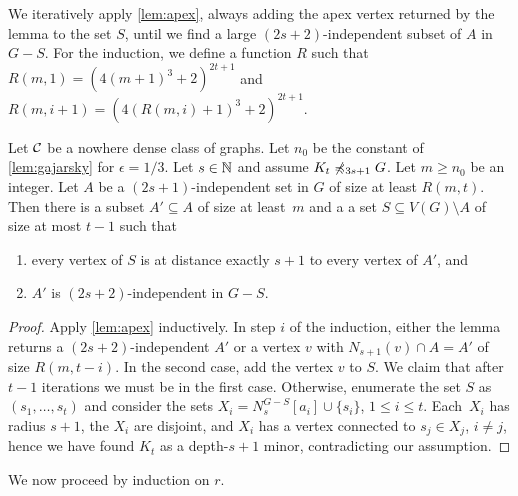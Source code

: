 We iteratively apply \cref{lem:apex}, always adding the apex vertex 
returned by the lemma to the set $S$, until we find a large 
$(2s+2)$-independent subset of $A$ in $G-S$. For the induction, we
define a function $R$ such that $R(m,1)=(4(m+1)^3+2)^{2t+1}$
and $R(m, i+1)=(4(R(m,i)+1)^3+2)^{2t+1}$.

\begin{lemma}\label{lem:iterate-apex}
Let $\mathcal{C}$ be a nowhere dense class of graphs. 
Let $n_0$ be the constant of \cref{lem:gajarsky} for $\epsilon=1/3$. 
Let $s\in \mathbb{N}$ and assume $K_t\not\preccurlyeq_{3s+1} G$. 
Let $m\geq n_0$ be an integer. 
Let $A$ be a $(2s+1)$-independent set in $G$ of size at least $R(m,t)$. 
Then there is a subset $A'\subseteq A$ of size at least~$m$ and a 
a set $S\subseteq V(G)\setminus A$ of size at most $t-1$ such that
\begin{enumerate}
\item every vertex of $S$ is at distance exactly $s+1$ to 
every vertex of $A'$, and
\item $A'$ is $(2s+2)$-independent in $G-S$. 
\end{enumerate} 
\end{lemma}
\begin{proof}
Apply \cref{lem:apex} inductively. In step $i$ of the induction,
either the lemma returns a $(2s+2)$-independent $A'$ or a vertex $v$
with $N_{s+1}(v)\cap A=A'$ of size $R(m,t-i)$. In the second
case, add the vertex $v$ to $S$. We claim that after $t-1$
iterations we must be in the first case. Otherwise, enumerate the set $S$ 
as $(s_1,\ldots, s_t)$ and consider the sets
$X_i=N_s^{G-S}[a_i]\cup \{s_i\}$, $1\leq i\leq t$. Each~$X_i$ has radius
$s+1$, the $X_i$ are disjoint, and $X_i$ has a vertex connected to $s_j\in X_j$, $i\neq j$, 
hence we have found $K_t$ as a depth-$s+1$ minor, contradicting
our assumption. 
\end{proof}

We now proceed by induction on $r$. 

